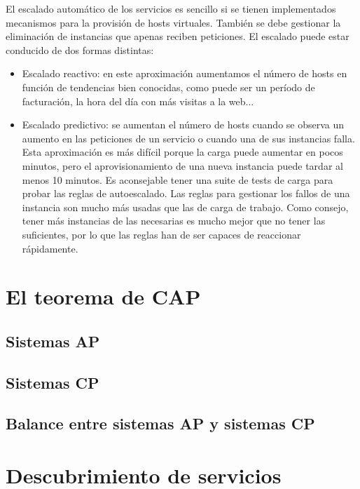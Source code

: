 \documentclass[11pt,a4paper]{article}
\begin{document}
El escalado automático de los servicios es sencillo si se tienen implementados mecanismos para la provisión de hosts virtuales. También se debe gestionar la eliminación de instancias que apenas reciben peticiones. El escalado puede estar conducido de dos formas distintas:

\begin{itemize}

\item Escalado reactivo: en este aproximación aumentamos el número de hosts en función de tendencias bien conocidas, como puede ser un período de facturación, la hora del día con más visitas a la web...

\item Escalado predictivo: se aumentan el número de hosts cuando se observa un aumento en las peticiones de un servicio o cuando una de sus instancias falla. Esta aproximación es más difícil porque la carga puede aumentar en pocos minutos, pero el aprovisionamiento de una nueva instancia puede tardar al menos 10 minutos. Es aconsejable tener una suite de tests de carga para probar las reglas de autoescalado. Las reglas para gestionar los fallos de una instancia son mucho más usadas que las de carga de trabajo. Como consejo, tener más instancias de las necesarias es mucho mejor que no tener las suficientes, por lo que las reglas han de ser capaces de reaccionar rápidamente.

\end{itemize}

\section{El teorema de CAP}

\subsection{Sistemas AP}

\subsection{Sistemas CP}

\subsection{Balance entre sistemas AP y sistemas CP}

\section{Descubrimiento de servicios}
\end{document}
